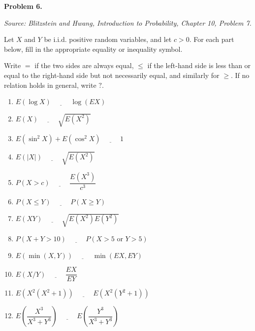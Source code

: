 \documentclass[11pt]{article}
\newcommand{\source}[2]{%
    \vspace{0.15cm}
    {\small\textit{Source: Blitzstein and Hwang, \textit{Introduction to Probability}, Chapter #1, Problem #2.}}
}
\begin{document}

\begin{problemheader}
\textbf{Problem 6.  }
\end{problemheader}
\source{10}{7}

Let $X$ and $Y$ be i.i.d. positive random variables, and let $c>0$. For each part below, fill in the appropriate equality or inequality symbol.

Write $=$ if the two sides are always equal, $\le$ if the left-hand side is less than or equal to the right-hand side but not necessarily equal, and similarly for $\ge$. If no relation holds in general, write $?$.

\begin{enumerate}[label=(\alph*), leftmargin=*]
    \item $E(\log X)\ \underline{\hspace{1cm}}\ \log(E X)$
    \item $E(X)\ \underline{\hspace{1cm}}\ \sqrt{E(X^2)}$
    \item $E(\sin^2 X)+E(\cos^2 X)\ \underline{\hspace{1cm}}\ 1$
    \item $E(|X|)\ \underline{\hspace{1cm}}\ \sqrt{E(X^2)}$
    \item $P(X>c)\ \underline{\hspace{1cm}}\ \dfrac{E(X^3)}{c^3}$
    \item $P(X\le Y)\ \underline{\hspace{1cm}}\ P(X\ge Y)$
    \item $E(XY)\ \underline{\hspace{1cm}}\ \sqrt{E(X^2)E(Y^2)}$
    \item $P(X+Y>10)\ \underline{\hspace{1cm}}\ P(X>5\text{ or }Y>5)$
    \item $E(\min(X,Y))\ \underline{\hspace{1cm}}\ \min(EX,EY)$
    \item $E(X/Y)\ \underline{\hspace{1cm}}\ \dfrac{EX}{EY}$
    \item $E\!\left(X^2(X^2+1)\right)\ \underline{\hspace{1cm}}\ E\!\left(X^2(Y^2+1)\right)$
    \item $E\!\left(\dfrac{X^3}{X^3+Y^3}\right)\ \underline{\hspace{1cm}}\ E\!\left(\dfrac{Y^3}{X^3+Y^3}\right)$
\end{enumerate}
\end{document}
